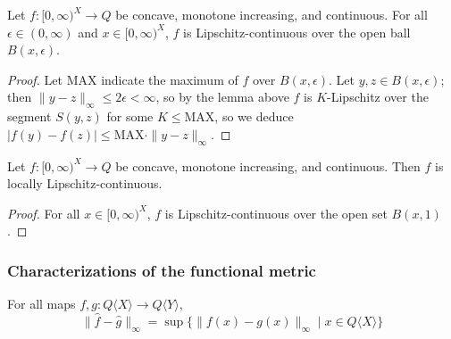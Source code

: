 \begin{proposition}
Let $f: [0,\infty)^{X}\to Q$ be concave, monotone increasing, and continuous.  
For all $\epsilon \in (0,\infty)$ and $ x \in [0,\infty)^{X}$, $f$ is Lipschitz-continuous over the open ball $B( x , \epsilon)$.
\end{proposition}
\begin{proof}
Let $\mathrm{MAX}$ indicate the maximum of $f$ over $B( x , \epsilon)$. 
Let $ y  ,  z  \in B( x , \epsilon)$; then $\| y  - z  \|_{\infty}\leq 2\epsilon < \infty$, so by the lemma above $f$ is $K$-Lipschitz over the segment $S( y  ,  z  )$ for some $K\leq \mathrm{MAX}$, so we deduce $|f( y  )-f( z  )|\leq \mathrm{MAX}\cdot \| y  - z  \|_{\infty}$.
\end{proof}

\begin{theorem}
Let $f: [0,\infty)^{X}\to Q$ be concave, monotone increasing, and continuous.  
Then $f$ is locally Lipschitz-continuous.
\end{theorem}
\begin{proof}
For all $ x \in [0,\infty)^{X}$, $f$ is Lipschitz-continuous over the open set $B( x , 1)$.
\end{proof}



\subsubsection{Characterizations of the functional metric }



  \begin{proposition}\label{prop:functionalmetric}
For all maps $f,g: Q\langle X\rangle\to Q\langle Y\rangle$,  
$$
  \|\widehat f- \widehat g\|_{\infty}=
  \sup\{\|f( x )- g( x )\|_{\infty} \mid  x \in Q\langle X\rangle\}
$$

\end{proposition}
  
%
%



